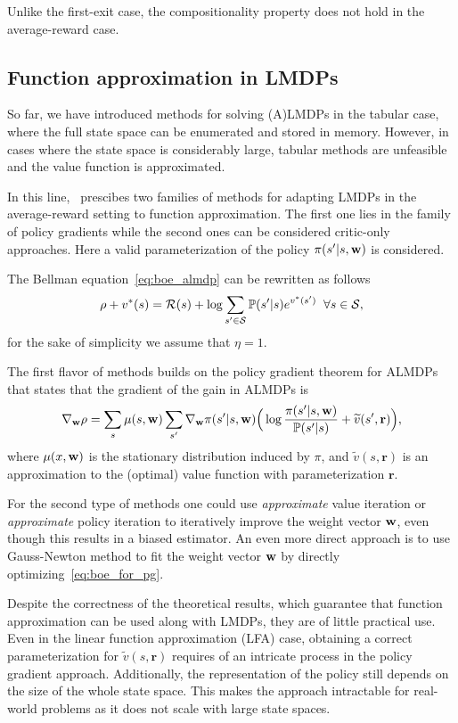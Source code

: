 Unlike the first-exit case, the compositionality property does not hold in the average-reward case.

\subsection{Function approximation in LMDPs}

So far, we have introduced methods for solving (A)LMDPs in the tabular case, where the full state space can be enumerated and stored in memory. However, in cases where the state space is considerably large, tabular methods are unfeasible and the value function is approximated.

In this line,~\cite{Todorov2010} prescibes two families of methods for adapting LMDPs in the average-reward setting to function approximation. The first one lies in the family of policy gradients while the second ones can be considered critic-only approaches. Here a valid parameterization of the policy $\pi(s'\lvert s, \mathbf{w})$ is considered.

The Bellman equation~\eqref{eq:boe_almdp} can be rewritten as follows
\begin{equation}
\label{eq:boe_for_pg}
\rho + v^*(s) =\mathcal{R}(s) +\log{\sum_{s'\in\mathcal{S}}\mathbb{P}(s'\lvert s)e^{v^*(s')}} \;\;\forall s\in\mathcal{S},
\end{equation}
for the sake of simplicity we assume that $\eta=1$. 

The first flavor of methods builds on the policy gradient theorem for ALMDPs~\citep[cf.~Theorem 1]{Todorov2010} that states that the gradient of the gain in ALMDPs is
\begin{equation}
  \nabla_{\mathbf{w}} \rho = \sum_{s}\mu(s, \mathbf{w}) \sum_{s'} \nabla_{\mathbf{w}} \pi(s'\lvert s, \mathbf{w})\Big( \log \frac{\pi(s'\lvert s, \mathbf{w})}{\mathbb{P}(s'\lvert s)} + \widetilde v(s', \mathbf{r})\Big),
\end{equation}
where $\mu(x, \mathbf{w})$ is the stationary distribution induced by $\pi$, and $\widetilde v(s,\mathbf{r})$ is an approximation to the (optimal) value function with parameterization $\mathbf r$.

For the second type of methods one could use \textit{approximate} value iteration or \textit{approximate} policy iteration to iteratively improve the weight vector $\mathbf{w}$, even though this results in a biased estimator. An even more direct approach is to use Gauss-Newton method to fit the weight vector $\mathbf{w}$ by directly optimizing~\eqref{eq:boe_for_pg}.

Despite the correctness of the theoretical results, which guarantee that function approximation can be used along with LMDPs, they are of little practical use. Even in the linear function approximation (LFA) case, obtaining a correct parameterization for $\widetilde v(s,\mathbf{r})$ requires of an intricate process in the policy gradient approach. Additionally, the representation of the policy still depends on the size of the whole state space. This makes the approach intractable for real-world problems as it does not scale with large state spaces.


